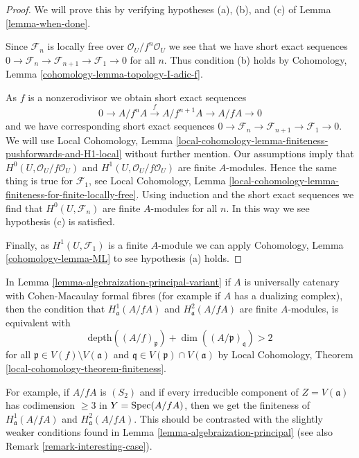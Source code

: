 \begin{proof}
We will prove this by verifying hypotheses (a), (b), and (c) of
Lemma \ref{lemma-when-done}.

\medskip\noindent
Since $\mathcal{F}_n$ is locally free over $\mathcal{O}_U/f^n\mathcal{O}_U$
we see that we have short exact sequences
$0 \to \mathcal{F}_n \to \mathcal{F}_{n + 1} \to \mathcal{F}_1 \to 0$
for all $n$. Thus condition (b) holds by
Cohomology, Lemma \ref{cohomology-lemma-topology-I-adic-f}.

\medskip\noindent
As $f$ is a nonzerodivisor we obtain short exact sequences
$$
0 \to A/f^nA \xrightarrow{f} A/f^{n + 1}A \to A/fA \to 0
$$
and we have corresponding short exact sequences
$0 \to \mathcal{F}_n \to \mathcal{F}_{n + 1} \to \mathcal{F}_1 \to 0$.
We will use
Local Cohomology, Lemma
\ref{local-cohomology-lemma-finiteness-pushforwards-and-H1-local}
without further mention. Our assumptions imply that
$H^0(U, \mathcal{O}_U/f\mathcal{O}_U)$ and
$H^1(U, \mathcal{O}_U/f\mathcal{O}_U)$
are finite $A$-modules. Hence the same thing is true for $\mathcal{F}_1$, see
Local Cohomology, Lemma
\ref{local-cohomology-lemma-finiteness-for-finite-locally-free}.
Using induction and the short exact sequences we find that
$H^0(U, \mathcal{F}_n)$ are finite $A$-modules for all $n$.
In this way we see hypothesis (c) is satisfied.

\medskip\noindent
Finally, as $H^1(U, \mathcal{F}_1)$ is a finite $A$-module
we can apply Cohomology, Lemma \ref{cohomology-lemma-ML}
to see hypothesis (a) holds.
\end{proof}

\begin{remark}
\label{remark-interesting-case-variant}
In Lemma \ref{lemma-algebraization-principal-variant}
if $A$ is universally catenary with Cohen-Macaulay
formal fibres (for example if $A$ has a dualizing complex), then
the condition that
$H^1_\mathfrak a(A/fA)$ and $H^2_\mathfrak a(A/fA)$
are finite $A$-modules, is equivalent with
$$
\text{depth}((A/f)_\mathfrak p) + \dim((A/\mathfrak p)_\mathfrak q) > 2
$$
for all $\mathfrak p \in V(f) \setminus V(\mathfrak a)$
and $\mathfrak q \in V(\mathfrak p) \cap V(\mathfrak a)$
by Local Cohomology, Theorem \ref{local-cohomology-theorem-finiteness}.

\medskip\noindent
For example, if $A/fA$ is $(S_2)$ and if every irreducible
component of $Z = V(\mathfrak a)$ has codimension $\geq 3$
in $Y = \mathop{\mathrm{Spec}}(A/fA)$, then we get the finiteness of
$H^1_\mathfrak a(A/fA)$ and $H^2_\mathfrak a(A/fA)$.
This should be contrasted with the slightly weaker conditions
found in Lemma \ref{lemma-algebraization-principal}
(see also Remark \ref{remark-interesting-case}).
\end{remark}






